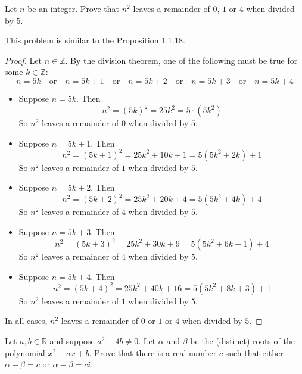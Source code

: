 \begin{exercise}
Let $n$ be an integer. Prove that $n^2$ leaves a remainder of $0$, $1$ or $4$ when divided by $5$.
\end{exercise}

\begin{solutions*}
    This problem is similar to the Proposition 1.1.18. 

    \begin{proof}
    Let $n \in \mathbb{Z}$. By the division theorem, one of the following must be true for some $k \in \mathbb{Z}$:
    \[
    n=5k \quad \text{or} \quad n=5k+1 \quad \text{or} \quad n=5k+2 \quad \text{or} \quad n=5k+3 \quad \text{or} \quad n=5k+4
    \]
    \begin{itemize}
    \item Suppose $n=5k$. Then
    \[
    n^2 = (5k)^2 = 25k^2 = 5 \cdot (5k^2)
    \]
    So $n^2$ leaves a remainder of $0$ when divided by $5$.
    \item Suppose $n=5k+1$. Then
    \[
    n^2 = (5k+1)^2 = 25k^2+10k+1 = 5(5k^2+2k)+1
    \]
    So $n^2$ leaves a remainder of $1$ when divided by $5$.
    \item Suppose $n=5k+2$. Then
    \[
    n^2 = (5k+2)^2 = 25k^2+20k+4 = 5(5k^2+4k)+4
    \]
    So $n^2$ leaves a remainder of $4$ when divided by $5$.
    \item Suppose $n=5k+3$. Then
    \[
    n^2 = (5k+3)^2 = 25k^2+30k+9 = 5(5k^2+6k+1)+4
    \]
    So $n^2$ leaves a remainder of $4$ when divided by $5$.
    \item Suppose $n=5k+4$. Then
    \[
    n^2 = (5k+4)^2 = 25k^2+40k+16 = 5(5k^2+8k+3)+1
    \]
    So $n^2$ leaves a remainder of $1$ when divided by $5$.
    \end{itemize}
    In all cases, $n^2$ leaves a remainder of $0$ or $1$ or $4$ when divided by $5$.
    \end{proof}
\end{solutions*}

\begin{exercise}
Let $a,b \in \mathbb{R}$ and suppose $a^2-4b \ne 0$. Let $\alpha$ and $\beta$ be the (distinct) roots of the polynomial $x^2+ax+b$. Prove that there is a real number $c$ such that either $\alpha-\beta = c$ or $\alpha - \beta = ci$.
\end{exercise}


